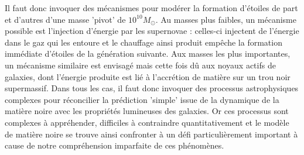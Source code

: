 Il faut donc invoquer des mécanismes pour modérer la formation d'étoiles de part et d'autres d'une masse 'pivot' de $10^{10} M_\odot$. Au masses plus faibles, un mécanisme possible est l'injection d'énergie par les supernovae : celles-ci injectent de l'énergie dans le gaz qui les entoure et le chauffage ainsi produit empêche la formation immédiate d'étoiles de la génération suivante. Aux masses les plus importantes, un mécanisme similaire est envisagé mais cette fois dû aux noyaux actifs de galaxies, dont l'énergie produite est lié à l'accrétion de matière sur un trou noir supermassif. Dans tous les cas, il faut donc invoquer des processus astrophysiques complexes pour réconcilier la prédiction 'simple' issue de la dynamique de la matière noire avec les propriétés lumineuses des galaxies. Or ces processus sont complexes à appréhender, difficiles à contraindre quantitativement et le modèle de matière noire se trouve ainsi confronter à un défi particulièrement important à cause de notre compréhension imparfaite de ces phénomènes.

